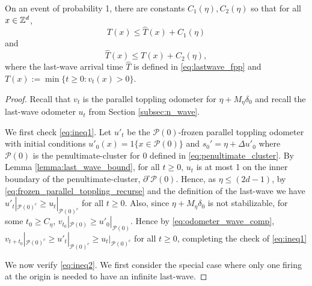 \documentclass[12pt]{amsart}
\begin{document}
\begin{prop} \label{prop:approximate_subadditive}
	On an event of probability 1, there are constants $C_1(\eta), C_2(\eta)$
	so that for all $x \in \mathbb{Z}^d$, 
	\begin{equation} \label{eq:ineq1}
	T(x) \leq \hat{T}(x) + C_1(\eta)
	\end{equation}
	and
	\begin{equation} \label{eq:ineq2}
	\hat{T}(x) \leq T(x) + C_2(\eta),
	\end{equation}
	where the last-wave arrival time $\hat{T}$ is defined in \eqref{eq:lastwave_fpp}  
	and $T(x) := \min \{ t \geq 0 : v_t(x) > 0 \}$. 
\end{prop}
\begin{proof}
	
	Recall that $v_t$ is the parallel toppling odometer for $\eta + M_{\eta}  \delta_0$ and recall the last-wave odometer $u_t$ from Section \ref{subsec:n_wave}.
	
	We first check \eqref{eq:ineq1}. 
	Let $u'_t$ be the $\mathcal{P}(0)$-frozen parallel toppling odometer with initial conditions $u'_0(x) = 1\{x \in \mathcal{P}(0)\}$ and
	$s_0' = \eta + \Delta u'_0$ 
	where $\mathcal{P}(0)$ is the penultimate-cluster for $0$ defined in \eqref{eq:penultimate_cluster}.
	By Lemma \ref{lemma:last_wave_bound}, for all $t \geq 0$, $u_{t}$ is at most 1 on the inner boundary of the penultimate-cluster, $\partial^{\circ} \mathcal{P}(0)$.  
	Hence, as $\eta \leq (2 d -1)$, 
	by \eqref{eq:frozen_parallel_toppling_recurse} and the definition of the last-wave we have $u'_t |_{\mathcal{P}(0)^c} \geq u_t |_{\mathcal{P}(0)^c}$ for all $t \geq 0$. Also, since $\eta + M_{\eta}  \delta_0$ is not stabilizable, for some $t_0 \geq C_{\eta}$, $v_{t_0} |_{\mathcal{P}(0)} \geq u'_{0} |_{\mathcal{P}(0)}$. 
	Hence by \eqref{eq:odometer_wave_comp}, $v_{t + t_0} |_{\mathcal{P}(0)^c} \geq u'_t |_{\mathcal{P}(0)^c} \geq u_t |_{\mathcal{P}(0)^c}$ for all $t \geq 0$, 
	completing the check of \eqref{eq:ineq1}
	
	
	We now verify \eqref{eq:ineq2}. We first consider the special case where only
	one firing at the origin is needed to have an infinite last-wave. 
	

\end{proof}
\end{document}

